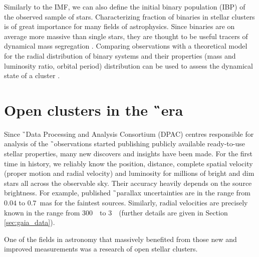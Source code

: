 Similarly to the IMF, we can also define the initial binary population (IBP) of the observed sample of stars. Characterizing fraction of binaries in stellar clusters is of great importance for many fields of astrophysics. Since binaries are on average more massive than single stars, they are thought to be useful tracers of dynamical mass segregation \cite{2015arXiv151000099D}. Comparing observations with a theoretical model for the radial distribution of binary systems and their properties (mass and luminosity ratio, orbital period) distribution can be used to assess the dynamical state of a cluster \cite{1999NewA....4..495K}.

\section{Open clusters in the \G\ era}
\label{sec:open_clust_gaia}
Since \G\ Data Processing and Analysis Consortium (DPAC) centres responsible for analysis of the \G\ observations started publishing publicly available ready-to-use stellar properties, many new discovers and insights have been made. For the first time in history, we reliably know the position, distance, complete spatial velocity (proper motion and radial velocity) and luminosity for millions of bright and dim stars all across the observable sky. Their accuracy heavily depends on the source brightness. For example, published \G\ parallax uncertainties are in the range from $0.04$ to $0.7$~mas for the faintest sources. Similarly, radial velocities are precisely known in the range from 300~\ms\ to 3~\kms\ (further details are given in Section \ref{sec:gaia_data}).

One of the fields in astronomy that massively benefited from those new and improved measurements was a research of open stellar clusters.


